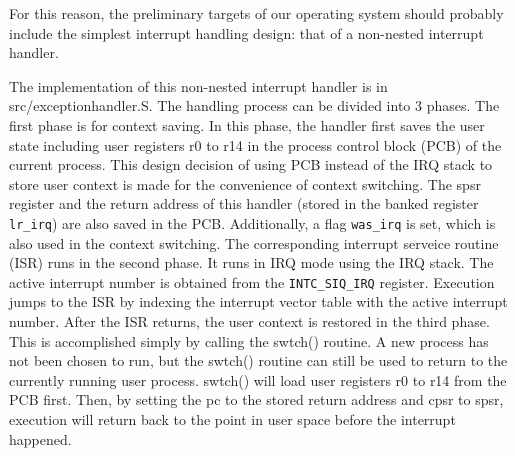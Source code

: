 \documentclass[12pt]{article}
\newcommand{\code}[1]{\colorbox{codegray}{\texttt{\footnotesize{#1}}}}
\begin{document}
For this reason, the preliminary targets of our operating system should
probably include the simplest interrupt handling design: that of a
non-nested interrupt handler.

The implementation of this non-nested interrupt handler is in src/exceptionhandler.S. 
The handling process can be divided into 3 phases. The first phase is for context 
saving. In this phase, the handler first saves the user state including user registers 
r0 to r14 in the process control block (PCB) of the current process. This design decision of 
using PCB instead of the IRQ stack to store user context is made for the 
convenience of context switching. The spsr register and the return address 
of this handler (stored in the banked register \code{lr\_irq}) are also saved in the PCB. 
Additionally, a flag \code{was\_irq} is set, which is also used in the context switching. 
The corresponding interrupt serveice routine (ISR) runs in the second phase. 
It runs in IRQ mode using the IRQ stack. The active interrupt number is obtained from the 
\code{INTC\_SIQ\_IRQ} register. Execution jumps to the ISR by indexing the 
interrupt vector table with the active interrupt number. After the ISR returns, the user
context is restored in the third phase. This is accomplished simply by calling the 
swtch() routine. A new process has not been chosen to run, but the swtch() 
routine can still be used to return to the currently running user process.
swtch() will load user registers r0 to r14 from the PCB first. Then, by setting the pc 
to the stored return address and cpsr to spsr, execution will return back to the point 
in user space before the interrupt happened.
\end{document}

